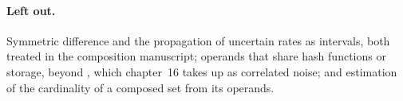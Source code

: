 \paragraph{Left out.}
Symmetric difference and the propagation of uncertain rates as intervals,
both treated in the composition manuscript; operands that share hash
functions or storage, beyond , which
chapter~16 takes up as correlated noise; and estimation of the cardinality of
a composed set from its operands.
